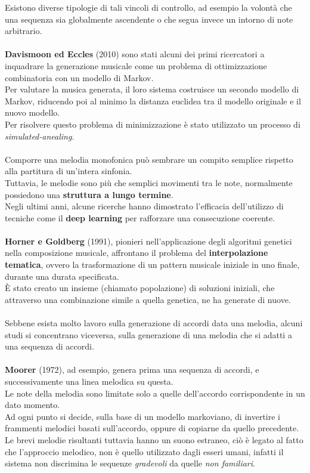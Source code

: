 \documentclass[a4paper,12pt]{report}
\begin{document}
Esistono diverse tipologie di tali vincoli di controllo, ad esempio la volontà che una sequenza sia globalmente ascendente o che segua invece un intorno di note arbitrario. \\
\\
\textbf{Davismoon ed Eccles} (2010) sono stati alcuni dei primi ricercatori a inquadrare la generazione musicale come un problema di ottimizzazione combinatoria con un modello di Markov.  \\
Per valutare la musica generata, il loro sistema costruisce un secondo modello di Markov, riducendo poi al minimo la distanza euclidea tra il modello originale e il nuovo modello.  \\
Per risolvere questo problema di minimizzazione è stato utilizzato un processo di \textit{simulated-anealing}. \\
\\
Comporre una melodia monofonica può sembrare un compito semplice rispetto alla partitura di un'intera sinfonia. \\
Tuttavia, le melodie sono più che semplici movimenti tra le note, normalmente possiedono una \textbf{struttura a lungo termine}. \\
Negli ultimi anni, alcune ricerche hanno dimostrato l’efficacia dell’utilizzo di tecniche come il \textbf{deep learning} per rafforzare una consecuzione coerente. \\
\\
\textbf{Horner e Goldberg} (1991), pionieri nell'applicazione degli algoritmi genetici nella composizione musicale, affrontano il problema del \textbf{interpolazione tematica}, ovvero la trasformazione di un pattern musicale iniziale in uno finale, durante una durata specificata. \\
È stato creato un insieme (chiamato popolazione) di soluzioni iniziali, che attraverso una combinazione simile a quella genetica, ne ha generate di nuove. \\
\\
Sebbene esista molto lavoro sulla generazione di accordi data una melodia, alcuni studi si concentrano viceversa, sulla generazione di una melodia che si adatti a una sequenza di accordi. \\
\\
\textbf{Moorer} (1972), ad esempio, genera prima una sequenza di accordi, e successivamente una linea melodica su questa. \\
Le note della melodia sono limitate solo a quelle dell'accordo corrispondente in un dato momento. \\
Ad ogni punto si decide, sulla base di un modello markoviano, di invertire i frammenti melodici basati sull'accordo, oppure di copiarne da quello precedente. \\
Le brevi melodie risultanti tuttavia hanno un suono estraneo, ciò è legato al fatto che l'approccio melodico, non è quello utilizzato dagli esseri umani, infatti il sistema non discrimina le sequenze \textit{gradevoli}  da quelle \textit{non familiari}. 
\end{document}
